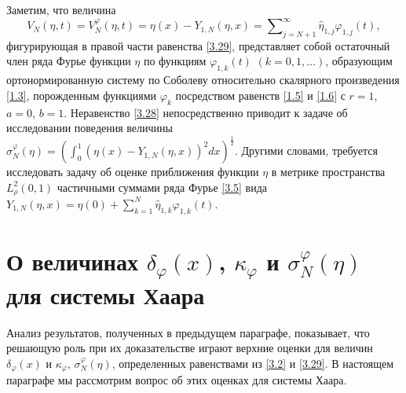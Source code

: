 Заметим,  что величина
\begin{equation}\label{3.30}
 V_N(\eta,t)=V_N^\varphi(\eta,t)=\eta(x)- Y_{1,N}(\eta,x)
=\sum\nolimits_{j=N+1}^\infty \hat \eta_{1,j}\varphi_{1,j}(t),
\end{equation}
  фигурирующая в правой части равенства \eqref{3.29}, представляет собой остаточный член ряда Фурье функции $\eta$ по функциям $\varphi_{1,k}(t)$ $(k=0,1,\ldots)$, образующим ортонормированную систему по Соболеву относительно скалярного произведения \eqref{1.3}, порожденным  функциями $\varphi_k$ посредством равенств \eqref{1.5} и \eqref{1.6} с $r=1$, $a=0$, $b=1$.  Неравенство \eqref{3.28} непосредственно приводит к  задаче об исследовании поведения величины $\sigma_N^\varphi(\eta)=(\int_{0}^1(\eta(x)- Y_{1,N}(\eta,x))^2 dx)^\frac12$.
Другими словами, требуется исследовать задачу об оценке приближения функции $\eta$ в метрике пространства $L^2_{\rho}(0,1)$ частичными суммами   ряда Фурье \eqref{3.5} вида $Y_{1,N}(\eta,x)= \eta(0)+ \sum\nolimits_{k=1}^N \hat \eta_{1,k}\varphi_{1,k}(t).$

\section{О величинах $\delta_\varphi(x)$, $\kappa_\varphi$ и $\sigma_N^\varphi(\eta)$ для системы Хаара }

Анализ результатов, полученных в предыдущем параграфе, показывает, что решающую роль
при их доказательстве играют верхние оценки для величин $\delta_\varphi(x)$ и $\kappa_\varphi$, $\sigma_N^\varphi(\eta)$, определенных равенствами из \eqref{3.2} и \eqref{3.29}.  В настоящем параграфе мы рассмотрим вопрос об этих оценках для   системы Хаара.

